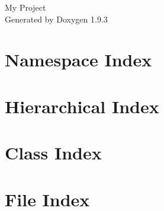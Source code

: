 \documentclass[twoside]{book}
\newcommand{\+}{\discretionary{\mbox{\scriptsize$\hookleftarrow$}}{}{}}
\newcommand{\clearemptydoublepage}{%
    \newpage{\pagestyle{empty}\cleardoublepage}%
  }
\begin{document}
  \raggedbottom
    \hypersetup{pageanchor=false,
                bookmarksnumbered=true,
                pdfencoding=unicode
               }
  \begin{titlepage}
  \vspace*{7cm}
  \begin{center}%
  {\Large My Project}\\
  \vspace*{1cm}
  {\large Generated by Doxygen 1.9.3}\\
  \end{center}
  \end{titlepage}
  \clearemptydoublepage
  \tableofcontents
  \clearemptydoublepage
  \hypersetup{pageanchor=true}
\chapter{Namespace Index}

\chapter{Hierarchical Index}

\chapter{Class Index}

\chapter{File Index}

\end{document}
